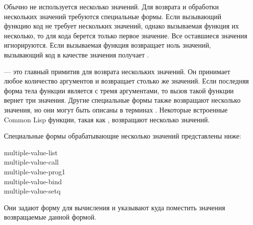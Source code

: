 Обычно не используется несколько значений. Для возврата и обработки нескольких
значений требуются специальные формы.
Если вызывающий функцию код не требует нескольких значений, однако вызываемая
функция их несколько, то для кода берется только первое значение. Все оставшиеся
значения игнорируются.
Если вызываемая функция возвращает ноль значений, вызывающий код в качестве
значения получает {\false}.

 --- это главный примитив для возврата нескольких значений. Он
принимает любое количество аргументов и возвращает столько же значений. Если
последняя форма тела функции является  с тремя аргументами, то вызов
такой функции вернет три значения.
Другие специальные формы также возвращают несколько значения, но они могут быть
описаны в терминах . Некоторые встроенные Common Lisp функции, такая
как , возвращают несколько значений.

Специальные формы обрабатывающие несколько значений представлены ниже:
\begin{lisp}
multiple-value-list \\
multiple-value-call \\
multiple-value-prog1 \\
multiple-value-bind \\
multiple-value-setq
\end{lisp}
Они задают форму для вычисления и указывают куда поместить значения возвращаемые
данной формой.


